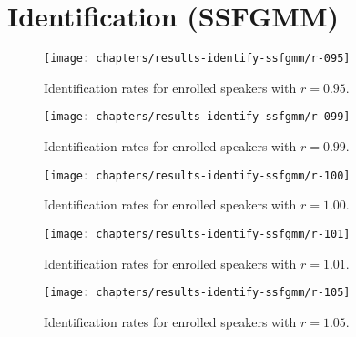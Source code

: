 \chapter{Identification (SSFGMM)}
\label{apx:results-identify-ssfgmm}



\begin{figure}[ht]
	\centering
	\texttt{[image: chapters/results-identify-ssfgmm/r-095]}
	\caption{Identification rates for enrolled speakers with $r = 0.95$.}
	\label{fig:r-095}
\end{figure}

\clearpage


\begin{figure}[ht]
	\centering
	\texttt{[image: chapters/results-identify-ssfgmm/r-099]}
	\caption{Identification rates for enrolled speakers with $r = 0.99$.}
	\label{fig:r-099}
\end{figure}

\clearpage


\begin{figure}[ht]
	\centering
	\texttt{[image: chapters/results-identify-ssfgmm/r-100]}
	\caption{Identification rates for enrolled speakers with $r = 1.00$.}
	\label{fig:r-100}
\end{figure}

\clearpage


\begin{figure}[ht]
	\centering
	\texttt{[image: chapters/results-identify-ssfgmm/r-101]}
	\caption{Identification rates for enrolled speakers with $r = 1.01$.}
	\label{fig:r-101}
\end{figure}

\clearpage


\begin{figure}[ht]
	\centering
	\texttt{[image: chapters/results-identify-ssfgmm/r-105]}
	\caption{Identification rates for enrolled speakers with $r = 1.05$.}
	\label{fig:r-105}
\end{figure}
